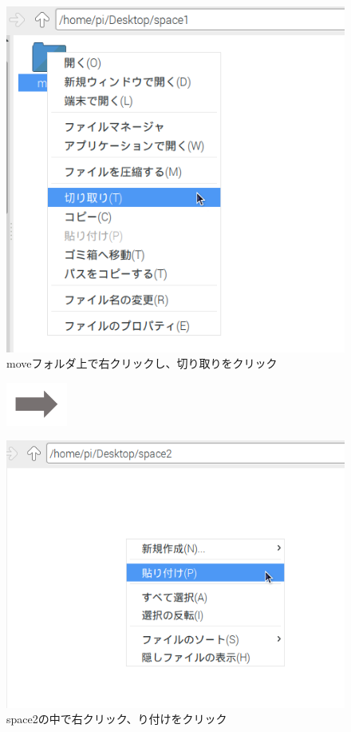 \begin{figure}[htbp]
  \centering
  \begin{minipage}{0.4\textwidth}
    \includegraphics[width=\linewidth]{text01-img/textbook-img048.png}
    { moveフォルダ上で右クリックし、切り取りをクリック
    }
  \end{minipage}
  \includegraphics[width=2cm]{text01-img/textbook-img049.png}
  \begin{minipage}{0.4\textwidth}
    \includegraphics[width=\linewidth]{text01-img/textbook-img046.png}
    { space2の中で右クリック、り付けをクリック
    }
  \end{minipage}


\end{figure}
